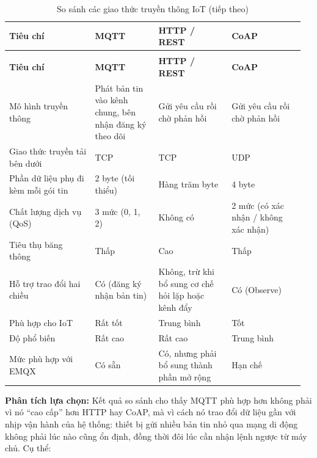 \documentclass[a4paper]{extarticle}
\newcommand{\thesissettableid}[2]{%
  \renewcommand{\thetable}{#1}%
  \renewcommand{\theHtable}{#2}%
}
\begin{document}
{\thesissettableid{2.2}{tab-ch2-iot-communication-protocols}
\def\LTcaptype{table}
\begin{longtable}{|L{0.279\linewidth}|L{0.206\linewidth}|L{0.232\linewidth}|L{0.238\linewidth}|}
\caption{So sánh các giao thức truyền thông IoT}\label{tab:ch2-iot-communication-protocols}\\
\hline \textbf{Tiêu chí} & \textbf{MQTT} & \textbf{HTTP / REST} & \textbf{CoAP} \\
\hline
\endfirsthead
\caption[]{So sánh các giao thức truyền thông IoT (tiếp theo)}\\
\hline \textbf{Tiêu chí} & \textbf{MQTT} & \textbf{HTTP / REST} & \textbf{CoAP} \\
\hline
\endhead
\hline
\endfoot
\endlastfoot
Mô hình truyền thông & Phát bản tin vào kênh chung, bên nhận đăng ký
theo dõi & Gửi yêu cầu rồi chờ phản hồi &
Gửi yêu cầu rồi chờ phản hồi \\\hline
Giao thức truyền tải bên dưới & TCP & TCP & UDP \\\hline
Phần dữ liệu phụ đi kèm mỗi gói tin & 2 byte (tối thiểu) & Hàng trăm
byte & 4 byte \\\hline
Chất lượng dịch vụ (QoS) & 3 mức (0, 1, 2) & Không có & 2 mức
(có xác nhận / không xác nhận) \\\hline
Tiêu thụ băng thông & Thấp & Cao & Thấp \\\hline
Hỗ trợ trao đổi hai chiều & Có (đăng ký nhận bản tin) & Không, trừ khi
bổ sung cơ chế hỏi lặp hoặc kênh đẩy & Có (Observe) \\\hline
Phù hợp cho IoT & Rất tốt & Trung bình & Tốt \\\hline
Độ phổ biến & Rất cao & Rất cao & Trung bình \\\hline
Mức phù hợp với EMQX & Có sẵn & Có, nhưng phải bổ sung thành phần mở rộng
& Hạn chế \\\hline
\end{longtable}
}

\textbf{Phân tích lựa chọn:} Kết quả so sánh cho thấy MQTT phù hợp hơn
không phải vì nó ``cao cấp'' hơn HTTP hay CoAP, mà vì cách nó trao đổi
dữ liệu gần với nhịp vận hành của hệ thống: thiết bị gửi nhiều bản tin
nhỏ qua mạng di động không phải lúc nào cũng ổn định, đồng thời đôi lúc
cần nhận lệnh ngược từ máy chủ. Cụ thể:
\end{document}
